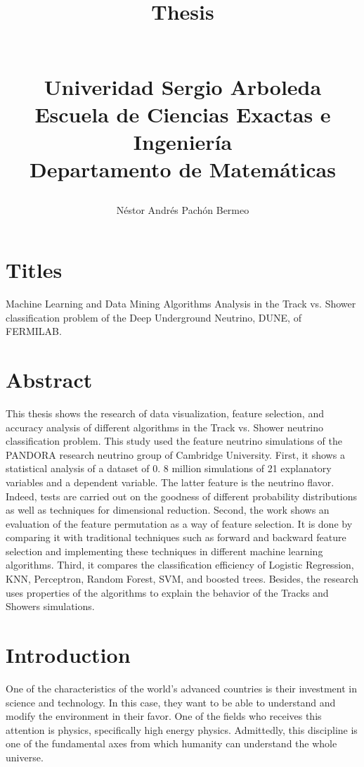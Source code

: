 \documentclass[paper=a4paper, fontsize=12pt]{scrartcl} %
\title{	
\normalfont \normalsize 
\horrule{0.5pt} \\[0.4cm] %
\huge Thesis\\ %
\horrule{2pt} \\[0.5cm] %
\date{}
\Large  {Univeridad Sergio Arboleda} \\  %
\Large  {Escuela de Ciencias Exactas e Ingeniería} \\
\Large  {Departamento de Matem\'aticas} \\
}
\author{N\'estor Andr\'es Pach\'on Bermeo } %
\numberwithin{equation}{section} %
\numberwithin{figure}{section} %
\numberwithin{table}{section} %
\begin{document}
\maketitle %

\section{Titles}
Machine Learning and Data Mining Algorithms Analysis in the Track vs. Shower classification problem of the Deep Underground Neutrino, DUNE, of FERMILAB.
\section{Abstract }


This thesis shows the research of data visualization, feature selection, and accuracy analysis of different algorithms in the Track vs. Shower neutrino classification problem. This study used the feature neutrino simulations of the PANDORA research neutrino group of Cambridge University. First, it shows a statistical analysis of a dataset of 0. 8 million simulations of 21 explanatory variables and a dependent variable. The latter feature is the neutrino flavor. Indeed, tests are carried out on the goodness of different probability distributions as well as techniques for dimensional reduction. Second, the work shows an evaluation of the feature permutation as a way of feature selection. It is done by comparing it with traditional techniques such as forward and backward feature selection and implementing these techniques in different machine learning algorithms. Third, it compares the classification efficiency of Logistic Regression, KNN, Perceptron, Random Forest, SVM, and boosted trees. Besides, the research uses properties of the algorithms to explain the behavior of the Tracks and Showers simulations. 
 
\section{Introduction}

One of the characteristics of the world's advanced countries is their investment in science and technology.  In this case, they want to be able to understand and modify the environment in their favor. One of the fields who receives this attention is physics, specifically high energy physics. Admittedly, this discipline is one of the fundamental axes from which humanity can understand the whole universe.
\end{document}
